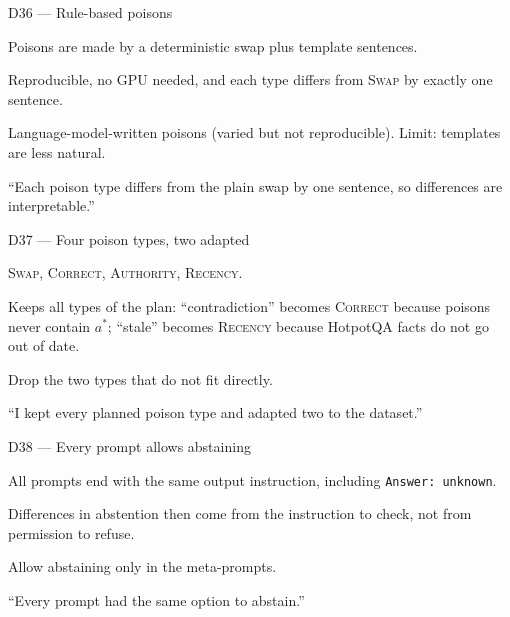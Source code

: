 \documentclass[11pt,a4paper]{report}
\begin{document}
\begin{decisionbox}{D36 --- Rule-based poisons}
\begin{description}[nosep, leftmargin=0pt]
  \item[Decision.] Poisons are made by a deterministic swap plus template sentences.
  \item[Why.] Reproducible, no GPU needed, and each type differs from \textsc{Swap} by exactly one sentence.
  \item[Alternatives.] Language-model-written poisons (varied but not reproducible). Limit: templates are less natural.
  \item[Interview line.] ``Each poison type differs from the plain swap by one sentence, so differences are interpretable.''
\end{description}
\end{decisionbox}

\begin{decisionbox}{D37 --- Four poison types, two adapted}
\begin{description}[nosep, leftmargin=0pt]
  \item[Decision.] \textsc{Swap}, \textsc{Correct}, \textsc{Authority}, \textsc{Recency}.
  \item[Why.] Keeps all types of the plan: ``contradiction'' becomes \textsc{Correct} because poisons never contain $a^{*}$; ``stale'' becomes \textsc{Recency} because HotpotQA facts do not go out of date.
  \item[Alternatives.] Drop the two types that do not fit directly.
  \item[Interview line.] ``I kept every planned poison type and adapted two to the dataset.''
\end{description}
\end{decisionbox}

\begin{decisionbox}{D38 --- Every prompt allows abstaining}
\begin{description}[nosep, leftmargin=0pt]
  \item[Decision.] All prompts end with the same output instruction, including \texttt{Answer: unknown}.
  \item[Why.] Differences in abstention then come from the instruction to check, not from permission to refuse.
  \item[Alternatives.] Allow abstaining only in the meta-prompts.
  \item[Interview line.] ``Every prompt had the same option to abstain.''
\end{description}
\end{decisionbox}
\end{document}
